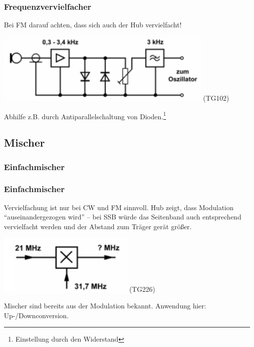\begin{frame}
  \frametitle{Frequenzvervielfacher}

  Bei FM darauf achten, dass sich auch der Hub vervielfacht!

  \begin{center}
    \includegraphics[width=0.8\textwidth,height=.5\textheight,keepaspectratio]{a13/TG102.png}
    {\tiny (TG102)}
  \end{center}

  Abhilfe z.B. durch Antiparallelschaltung von Dioden.\footnote{Einstellung durch
  den Widerstand}

\end{frame}

\subsection{Mischer}

\subsubsection{Einfachmischer}

\begin{frame}
  \frametitle{Einfachmischer}

  Vervielfachung ist nur bei CW und FM sinnvoll. Hub zeigt, dass Modulation ``auseinandergezogen wird'' -- bei SSB würde das Seitenband auch entsprechend vervielfacht werden und der Abstand zum Träger gerät größer.

  \begin{center}
    \includegraphics[width=0.5\textwidth,height=.5\textheight,keepaspectratio]{a13/TG226.png}
    {\tiny (TG226)}
  \end{center}

  Mischer sind bereits aus der Modulation bekannt. Anwendung hier:
  Up-/Downconversion.
\end{frame}

